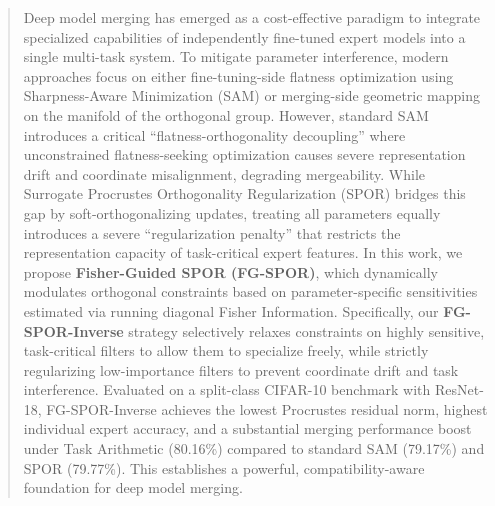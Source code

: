 \documentclass{article}
\theoremstyle{plain}
\theoremstyle{definition}
\theoremstyle{remark}
\begin{document}

\printAffiliationsAndNotice{}

\begin{abstract}
  Deep model merging has emerged as a cost-effective paradigm to integrate specialized capabilities of independently fine-tuned expert models into a single multi-task system. To mitigate parameter interference, modern approaches focus on either fine-tuning-side flatness optimization using Sharpness-Aware Minimization (SAM) or merging-side geometric mapping on the manifold of the orthogonal group. However, standard SAM introduces a critical ``flatness-orthogonality decoupling'' where unconstrained flatness-seeking optimization causes severe representation drift and coordinate misalignment, degrading mergeability. While Surrogate Procrustes Orthogonality Regularization (SPOR) bridges this gap by soft-orthogonalizing updates, treating all parameters equally introduces a severe ``regularization penalty'' that restricts the representation capacity of task-critical expert features. In this work, we propose \textbf{Fisher-Guided SPOR (FG-SPOR)}, which dynamically modulates orthogonal constraints based on parameter-specific sensitivities estimated via running diagonal Fisher Information. Specifically, our \textbf{FG-SPOR-Inverse} strategy selectively relaxes constraints on highly sensitive, task-critical filters to allow them to specialize freely, while strictly regularizing low-importance filters to prevent coordinate drift and task interference. Evaluated on a split-class CIFAR-10 benchmark with ResNet-18, FG-SPOR-Inverse achieves the lowest Procrustes residual norm, highest individual expert accuracy, and a substantial merging performance boost under Task Arithmetic (80.16\%) compared to standard SAM (79.17\%) and SPOR (79.77\%). This establishes a powerful, compatibility-aware foundation for deep model merging.
\end{abstract}
\end{document}
